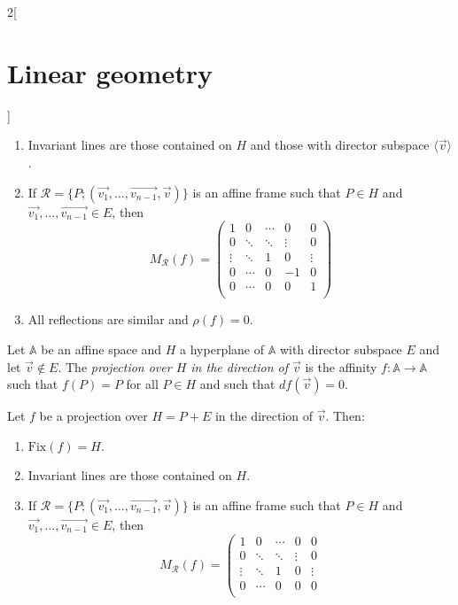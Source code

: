 \documentclass[class=article,10pt,crop=false]{standalone}
\begin{document}
\begin{multicols}{2}[\section{Linear geometry}]
\begin{prop}
\begin{enumerate}
    \item Invariant lines are those contained on $H$ and those with director subspace $\langle\overrightarrow{v}\rangle$.
    \item If $\mathcal{R}=\{P;(\overrightarrow{v_1},\ldots,\overrightarrow{v_{n-1}},\overrightarrow{v})\}$ is  an affine frame such that $P\in H$ and $\overrightarrow{v_1},\ldots,\overrightarrow{v_{n-1}}\in E$, then $$M_\mathcal{R}(f)=\left(\begin{array}{cccc|c}
    1 & 0 & \cdots & 0 & 0\\
    0 & \ddots & \ddots & \vdots & 0\\
    \vdots & \ddots & 1 & 0 & \vdots\\
     0&\cdots & 0 & -1 & 0\\
    \hline
    0 & \cdots & 0 & 0 &  1\\
    \end{array}\right)$$
    \item All reflections are similar and $\rho(f)=0$.
\end{enumerate}
\end{prop}
\begin{definition}[Projections]
Let $\mathbb{A}$ be an affine space and $H$ a hyperplane of $\mathbb{A}$ with director subspace $E$ and let $\overrightarrow{v}\notin E$. The \textit{projection over $H$ in the direction of $\overrightarrow{v}$} is the affinity $f:\mathbb{A}\rightarrow\mathbb{A}$ such that $f(P)=P$ for all $P\in H$ and such that $df(\overrightarrow{v})=0$.
\end{definition}
\begin{prop}
Let $f$ be a projection over $H=P+E$ in the direction of $\overrightarrow{v}$. Then:
\begin{enumerate}
    \item $\text{Fix}(f)=H$.
    \item Invariant lines are those contained on $H$.
    \item If $\mathcal{R}=\{P;(\overrightarrow{v_1},\ldots,\overrightarrow{v_{n-1}},\overrightarrow{v})\}$ is  an affine frame such that $P\in H$ and $\overrightarrow{v_1},\ldots,\overrightarrow{v_{n-1}}\in E$, then $$M_\mathcal{R}(f)=\left(\begin{array}{cccc|c}
    1 & 0 & \cdots & 0 & 0\\
    0 & \ddots & \ddots & \vdots & 0\\
    \vdots & \ddots & 1 & 0 & \vdots\\
     0&\cdots & 0 & 0 & 0\\

\end{array}$$
\end{enumerate}
\end{prop}
\end{multicols}
\end{document}
